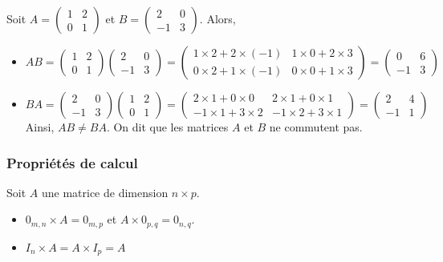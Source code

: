 \documentclass[11pt,fleqn]{book} %
\begin{document}
\begin{example}Soit $A=\begin{pmatrix}1 & 2 \\ 0 & 1\end{pmatrix}$ et $B = \begin{pmatrix}2 & 0 \\ -1 & 3\end{pmatrix}$. Alors,

\begin{itemize}
\item $AB = \begin{pmatrix}1 & 2 \\ 0 & 1\end{pmatrix} \begin{pmatrix}2 & 0 \\ -1 & 3\end{pmatrix} = \begin{pmatrix} 1 \times 2 + 2 \times (-1) & 1 \times 0 + 2 \times 3 \\0 \times 2 + 1 \times (-1) & 0 \times 0 + 1 \times 3\end{pmatrix} = \begin{pmatrix} 0 & 6 \\ -1 & 3\end{pmatrix} $
\vskip5pt
\item $BA = \begin{pmatrix}2 & 0 \\ -1 & 3\end{pmatrix}\begin{pmatrix}1 & 2 \\ 0 & 1\end{pmatrix}=\begin{pmatrix} 2 \times 1 + 0 \times 0 & 2 \times 1 + 0 \times 1 \\ -1 \times 1 + 3 \times 2 & -1 \times 2 + 3 \times 1 \end{pmatrix} = \begin{pmatrix}
2 & 4 \\ -1 & 1
\end{pmatrix}$
\vskip5pt
Ainsi, $AB \neq BA$. On dit que les matrices $A$ et $B$ ne commutent pas.
\end{itemize}\end{example}

\subsubsection{Propriétés de calcul}

\begin{proposition}Soit $A$ une matrice de dimension $n \times p$.

\begin{itemize}
\item $0_{m,n} \times A = 0_{m,p}$ et $A \times 0_{p,q} = 0_{n,q}$.
\item $I_n \times A = A \times I_p = A$
\end{itemize}\end{proposition}
\end{document}
